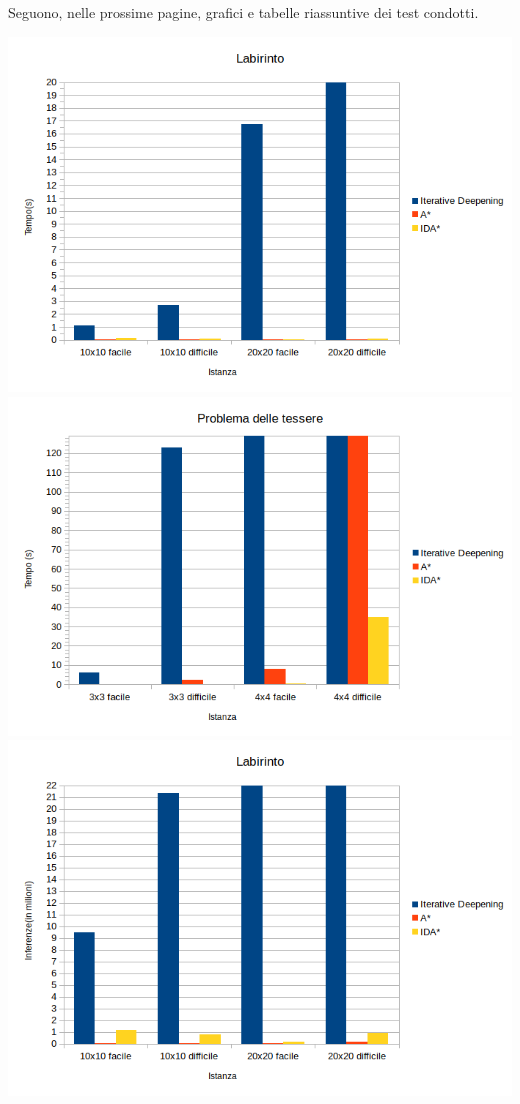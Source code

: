 \documentclass[a4paper,oneside,12pt]{book}
\begin{document}
	Seguono, nelle prossime pagine, grafici e tabelle riassuntive dei test condotti.

	\begin{center}
		\includegraphics[height=0.70\textwidth	]{labirintoTempo}
		\includegraphics[height=0.70\textwidth]{tessereTempo}
		\includegraphics[height=0.70\textwidth]{labirintoInferenze}


\end{center}
\end{document}
